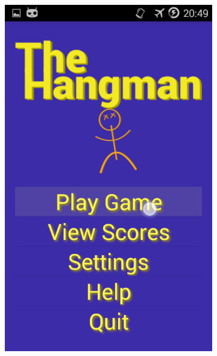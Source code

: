 \begin{figure}[float]
    \centering
   \begin{subfigure}[b]{0.25\textwidth}
        \includegraphics[width=\textwidth]{./img/design/d1.png}
    \end{subfigure}
    \begin{subfigure}[b]{0.25\textwidth}

\end{subfigure}
\end{figure}
